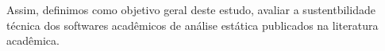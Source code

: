 %

Assim, definimos como objetivo geral deste estudo, avaliar a sustentbilidade
técnica dos softwares acadêmicos de análise estática publicados na literatura
acadêmica.

